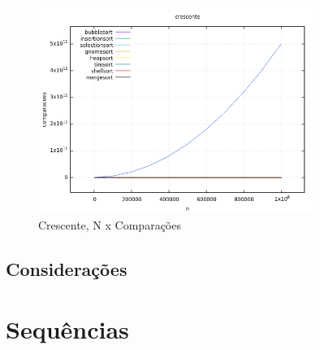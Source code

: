 \documentclass[report]{uftex}
\begin{document}
\begin{figure}[h]
\centering
\caption{Crescente, N x Comparações}
\includegraphics[width=0.8\textwidth]{graphs/crescente-comparações.png}
\end{figure}

\section{Considerações}

\backmatter 
\singlespacing   


\appendix
\onehalfspacing

\chapter{Sequências}
\label{ape:sequencias}
\end{document}
